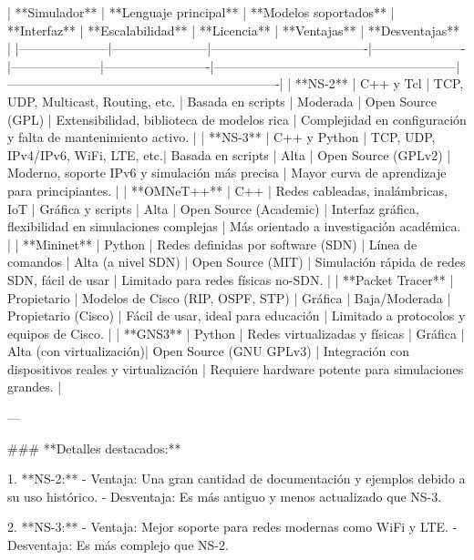 | **Simulador**       | **Lenguaje principal** | **Modelos soportados**              | **Interfaz**         | **Escalabilidad**   | **Licencia**           | **Ventajas**                                             | **Desventajas**                                                |
|---------------------|-----------------------|-------------------------------------|----------------------|---------------------|-------------------------|---------------------------------------------------------|----------------------------------------------------------------|
| **NS-2**            | C++ y Tcl            | TCP, UDP, Multicast, Routing, etc. | Basada en scripts    | Moderada            | Open Source (GPL)       | Extensibilidad, biblioteca de modelos rica             | Complejidad en configuración y falta de mantenimiento activo. |
| **NS-3**            | C++ y Python         | TCP, UDP, IPv4/IPv6, WiFi, LTE, etc.| Basada en scripts    | Alta                | Open Source (GPLv2)     | Moderno, soporte IPv6 y simulación más precisa         | Mayor curva de aprendizaje para principiantes.                |
| **OMNeT++**         | C++                  | Redes cableadas, inalámbricas, IoT | Gráfica y scripts    | Alta                | Open Source (Academic)  | Interfaz gráfica, flexibilidad en simulaciones complejas | Más orientado a investigación académica.                      |
| **Mininet**         | Python               | Redes definidas por software (SDN) | Línea de comandos    | Alta (a nivel SDN)  | Open Source (MIT)       | Simulación rápida de redes SDN, fácil de usar          | Limitado para redes físicas no-SDN.                           |
| **Packet Tracer**   | Propietario          | Modelos de Cisco (RIP, OSPF, STP)  | Gráfica              | Baja/Moderada       | Propietario (Cisco)     | Fácil de usar, ideal para educación                    | Limitado a protocolos y equipos de Cisco.                     |
| **GNS3**            | Python               | Redes virtualizadas y físicas      | Gráfica              | Alta (con virtualización)| Open Source (GNU GPLv3) | Integración con dispositivos reales y virtualización   | Requiere hardware potente para simulaciones grandes.          |

---

### **Detalles destacados:**

1. **NS-2:**  
   - Ventaja: Una gran cantidad de documentación y ejemplos debido a su uso histórico.  
   - Desventaja: Es más antiguo y menos actualizado que NS-3.

2. **NS-3:**  
   - Ventaja: Mejor soporte para redes modernas como WiFi y LTE.  
   - Desventaja: Es más complejo que NS-2.

